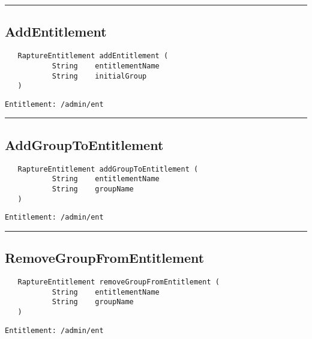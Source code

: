 \rule{12cm}{2pt}
\subsection{AddEntitlement}
\label{Api:AddEntitlement}
\begin{Verbatim}
   RaptureEntitlement addEntitlement (
           String    entitlementName
           String    initialGroup
   )
\end{Verbatim}
\begin{Verbatim}[formatcom=\color{Maroon}]
  Entitlement: /admin/ent
\end{Verbatim}



\rule{12cm}{2pt}
\subsection{AddGroupToEntitlement}
\label{Api:AddGroupToEntitlement}
\begin{Verbatim}
   RaptureEntitlement addGroupToEntitlement (
           String    entitlementName
           String    groupName
   )
\end{Verbatim}
\begin{Verbatim}[formatcom=\color{Maroon}]
  Entitlement: /admin/ent
\end{Verbatim}



\rule{12cm}{2pt}
\subsection{RemoveGroupFromEntitlement}
\label{Api:RemoveGroupFromEntitlement}
\begin{Verbatim}
   RaptureEntitlement removeGroupFromEntitlement (
           String    entitlementName
           String    groupName
   )
\end{Verbatim}
\begin{Verbatim}[formatcom=\color{Maroon}]
  Entitlement: /admin/ent
\end{Verbatim}



